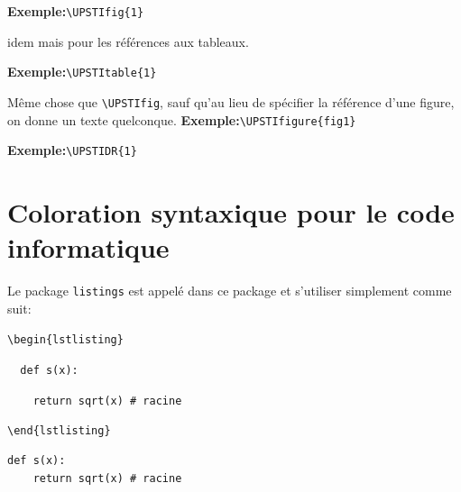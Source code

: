 \documentclass[11pt]{ltxdockit}[2010/09/26]
\newcommand{\ex}{\noindent \textbf{Exemple:}\quad}
\begin{document}
\vspace{1em}
\begin{ltxsyntax}
\end{ltxsyntax}
\ex\verb!\UPSTIfig{1}!

\vspace{1em}

\vspace{1em}
\begin{ltxsyntax}
\end{ltxsyntax}

\noindent idem mais pour les références aux tableaux.

\ex\verb!\UPSTItable{1}!
\vspace{1em}
\begin{ltxsyntax}
\end{ltxsyntax}
\noindent Même chose que \verb!\UPSTIfig!, sauf qu'au lieu de spécifier la référence d'une figure, on donne un texte quelconque.
\ex\verb!\UPSTIfigure{fig1}!

\vspace{1em}

\vspace{1em}
\begin{ltxsyntax}
\end{ltxsyntax}
\ex\verb!\UPSTIDR{1}!

\vspace{1em}

\section{Coloration syntaxique pour le code informatique}

\begin{ltxsyntax}
\end{ltxsyntax}

\noindent Le package \texttt{listings} est appelé dans ce package et s'utiliser simplement comme suit:

\verb!\begin{lstlisting}!

\verb!  def s(x):!

\verb!    return sqrt(x) # racine!

\verb!\end{lstlisting}!

\begin{lstlisting}
def s(x):
	return sqrt(x) # racine
\end{lstlisting}
\end{document}

